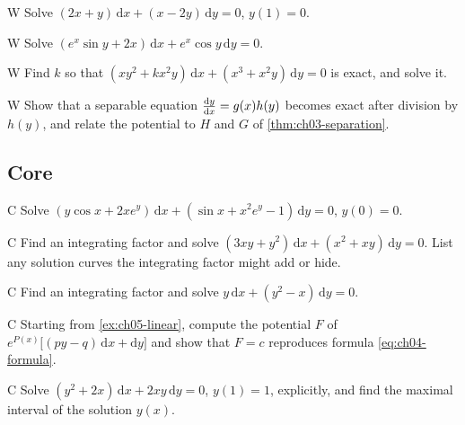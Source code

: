 \begin{problem}{W}\label{prob:ch05-w2}
Solve $(2x + y)\,\mathrm{d}x + (x - 2y)\,\mathrm{d}y = 0$, $y(1) = 0$.
\end{problem}

\begin{problem}{W}\label{prob:ch05-w3}
Solve $(e^x\sin y + 2x)\,\mathrm{d}x + e^x\cos y\,\mathrm{d}y = 0$.
\end{problem}

\begin{problem}{W}\label{prob:ch05-w4}
Find $k$ so that $(xy^2 + kx^2y)\,\mathrm{d}x + (x^3 + x^2y)\,\mathrm{d}y = 0$ is
exact, and solve it.
\end{problem}

\begin{problem}{W}\label{prob:ch05-w5}
Show that a separable equation $\frac{\mathrm{d}y}{\mathrm{d}x} = g(x)h(y)$ becomes exact after
division by $h(y)$, and relate the potential to $H$ and $G$ of
\cref{thm:ch03-separation}.
\end{problem}

\subsection*{Core}

\begin{problem}{C}\label{prob:ch05-c1}
Solve $(y\cos x + 2xe^y)\,\mathrm{d}x + (\sin x + x^2e^y - 1)\,\mathrm{d}y = 0$,
$y(0) = 0$.
\end{problem}

\begin{problem}{C}\label{prob:ch05-c2}
Find an integrating factor and solve $(3xy + y^2)\,\mathrm{d}x + (x^2 + xy)\,\mathrm{d}y = 0$.
List any solution curves the integrating factor might add or hide.
\end{problem}

\begin{problem}{C}\label{prob:ch05-c3}
Find an integrating factor and solve $y\,\mathrm{d}x + (y^2 - x)\,\mathrm{d}y = 0$.
\end{problem}

\begin{problem}{C}\label{prob:ch05-c4}
Starting from \cref{ex:ch05-linear}, compute the potential $F$ of
$e^{P(x)}\bigl[(p y - q)\,\mathrm{d}x + \mathrm{d}y\bigr]$ and show that $F = c$
reproduces formula \eqref{eq:ch04-formula}.
\end{problem}

\begin{problem}{C}\label{prob:ch05-c5}
Solve $(y^2 + 2x)\,\mathrm{d}x + 2xy\,\mathrm{d}y = 0$, $y(1) = 1$, explicitly,
and find the maximal interval of the solution $y(x)$.
\end{problem}

